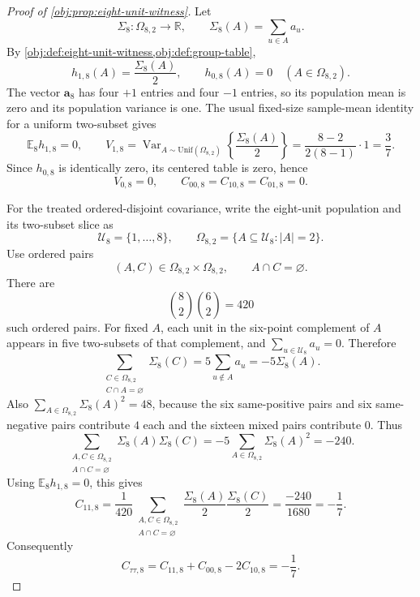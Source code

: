 \begin{proof}[Proof of \cref{obj:prop:eight-unit-witness}]
Let
\[
\Sigma_8:\Omega_{8,2}\to\mathbb R,
\qquad
\Sigma_8(A)=\sum_{u\in A} a_u .
\]
By \cref{obj:def:eight-unit-witness,obj:def:group-table},
\[
h_{1,8}(A)=\frac{\Sigma_8(A)}{2},
\qquad
h_{0,8}(A)=0
\quad (A\in\Omega_{8,2}).
\]
The vector \(\mathbf a_8\) has four \(+1\) entries and four \(-1\) entries, so its population mean is zero and its population variance is one. The usual fixed-size sample-mean identity for a uniform two-subset gives
\[
\mathbb E_8 h_{1,8}=0,
\qquad
V_{1,8}
=
\operatorname{Var}_{A\sim\mathrm{Unif}(\Omega_{8,2})}
  \left\{\frac{\Sigma_8(A)}{2}\right\}
=
\frac{8-2}{2(8-1)}\cdot 1
=
\frac{3}{7}.
\]
Since \(h_{0,8}\) is identically zero, its centered table is zero, hence
\[
V_{0,8}=0,
\qquad
C_{00,8}=C_{10,8}=C_{01,8}=0 .
\]

For the treated ordered-disjoint covariance, write the eight-unit population and its two-subset slice as
\[
\mathcal U_8=\{1,\ldots,8\},
\qquad
\Omega_{8,2}=\{A\subseteq\mathcal U_8: |A|=2\}.
\]
Use ordered pairs
\[
(A,C)\in\Omega_{8,2}\times\Omega_{8,2},
\qquad
A\cap C=\varnothing .
\]
There are
\[
\binom82\binom62=420
\]
such ordered pairs. For fixed \(A\), each unit in the six-point complement of \(A\) appears in five two-subsets of that complement, and \(\sum_{u\in\mathcal U_8}a_u=0\). Therefore
\[
\sum_{\substack{C\in\Omega_{8,2}\\ C\cap A=\varnothing}}\Sigma_8(C)
=
5\sum_{u\notin A}a_u
=
-5\Sigma_8(A).
\]
Also \(\sum_{A\in\Omega_{8,2}}\Sigma_8(A)^2=48\), because the six same-positive pairs and six same-negative pairs contribute \(4\) each and the sixteen mixed pairs contribute \(0\). Thus
\[
\sum_{\substack{A,C\in\Omega_{8,2}\\ A\cap C=\varnothing}}
\Sigma_8(A)\Sigma_8(C)
=
-5\sum_{A\in\Omega_{8,2}}\Sigma_8(A)^2
=
-240.
\]
Using \(\mathbb E_8h_{1,8}=0\), this gives
\[
C_{11,8}
=
\frac1{420}
\sum_{\substack{A,C\in\Omega_{8,2}\\ A\cap C=\varnothing}}
\frac{\Sigma_8(A)}2\frac{\Sigma_8(C)}2
=
\frac{-240}{1680}
=
-\frac17 .
\]
Consequently
\[
C_{\tau\tau,8}
=
C_{11,8}+C_{00,8}-2C_{10,8}
=
-\frac17 .
\]


\end{proof}
